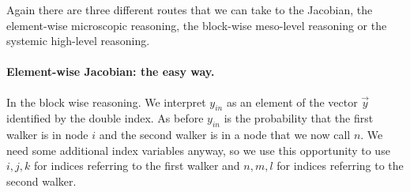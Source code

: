 Again there are three different routes that we can take to the Jacobian, the element-wise microscopic reasoning, the block-wise meso-level reasoning or the systemic high-level reasoning.

\paragraph{Element-wise Jacobian: the easy way.}
In the block wise reasoning. We interpret $y_{in}$ as an element of the vector $\vec{y}$ identified by the double index.
As before $y_{in}$ is the probability that the first walker is in node $i$ and the second walker is in a node that we now call $n$. We need some additional index variables anyway, so we use this opportunity to use $i,j,k$ for indices referring to the first walker and $n,m,l$ for indices referring to the second walker.   

